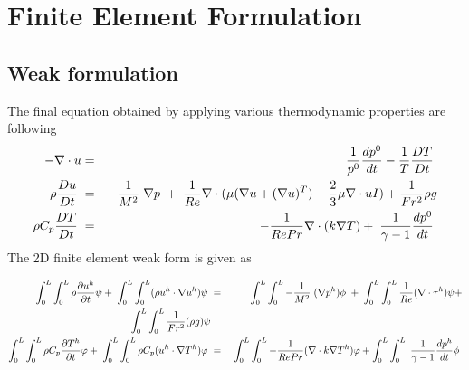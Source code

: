 \chapter{Finite Element Formulation}
\section{Weak formulation}
The final equation obtained by applying various thermodynamic properties are following
\begin{eqnarray}
-\nabla \cdot u &=& \frac{1}{p^0} \frac{d p^0}{d t} - \frac{1}{T}\frac{D T}{D t} \hspace{1mm}\\
\rho \frac{D u}{D t} \hspace{1mm} &=& -\frac{1}{M^2}\hspace{1mm}\nabla p\hspace{1mm}+\hspace{1mm}\frac{1}{Re}\nabla \cdot (\mu (\nabla u +(\nabla u)^T) - \frac{2}{3}\mu \nabla \cdot u I) + \frac{1}{Fr^2}\rho g \\
\rho C_p \frac{D T}{D t} \hspace{1mm}&=&\hspace{1mm} -  \frac{1}{Re Pr}\nabla\cdot (k \nabla T) + \hspace{1mm} \frac{1}{\gamma -1} \frac{d p^0}{d t}\hspace{1mm}\\
\end{eqnarray}
The 2D finite element weak form  is given as

\begin{eqnarray*}
\int_{0}^{L} \int_{0}^{L}\rho \frac{\partial u^h}{\partial t} \psi + \hspace{1mm}\int_{0}^{L} \int_{0}^{L} (\rho u^h \cdot \nabla u^h ) \psi \hspace{1mm} &=& \int_{0}^{L} \int_{0}^{L}  -\frac{1}{M^2}\hspace{1mm}(\nabla p^h) \phi \hspace{1mm}+\hspace{1mm}\int_{0}^{L} \int_{0}^{L}\frac{1}{Re}(\nabla \cdot \tau^h) \psi+ \\ \int_{0}^{L} \int_{0}^{L}\frac{1}{Fr^2}(\rho g )\psi \\
\int_{0}^{L} \int_{0}^{L} \rho C_p \frac{\partial T^h}{\partial t} \varphi + \hspace{1mm}\int_{0}^{L} \int_{0}^{L} \rho C_p (u^h \cdot \nabla T^h ) \varphi  \hspace{1mm}&=&\hspace{1mm} \int_{0}^{L} \int_{0}^{L} -  \frac{1}{Re Pr}(\nabla\cdot k \nabla T^h) \varphi  + \int_{0}^{L} \int_{0}^{L} \hspace{1mm} \frac{1}{\gamma -1} \frac{d p^h}{d t} \phi  \hspace{1mm}\\
\end{eqnarray*}

